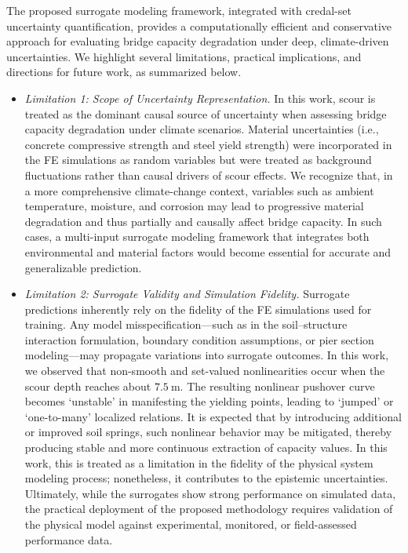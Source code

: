 \documentclass[authoryear,preprint,review,12pt]{elsarticle}
\begin{document}
The proposed surrogate modeling framework, integrated with credal-set uncertainty quantification, provides a computationally efficient and conservative approach for evaluating bridge capacity degradation under deep, climate-driven uncertainties. We highlight several limitations, practical implications, and directions for future work, as summarized below.

\begin{itemize}


\item \textit{Limitation 1: Scope of Uncertainty Representation.} 
In this work, scour is treated as the dominant causal source of uncertainty when assessing bridge capacity degradation under climate scenarios. Material uncertainties (i.e., concrete compressive strength and steel yield strength) were incorporated in the FE simulations as random variables but were treated as background fluctuations rather than causal drivers of scour effects. 
We recognize that, in a more comprehensive climate-change context, variables such as ambient temperature, moisture, and corrosion may lead to progressive material degradation and thus partially and causally affect bridge capacity. In such cases, a multi-input surrogate modeling framework that integrates both environmental and material factors would become essential for accurate and generalizable prediction. 



    \item \textit{Limitation 2: Surrogate Validity and Simulation Fidelity.} 
    Surrogate predictions inherently rely on the fidelity of the FE simulations used for training. Any model misspecification—such as in the soil–structure interaction formulation, boundary condition assumptions, or pier section modeling—may propagate variations into surrogate outcomes. In this work, we observed that non-smooth and set-valued nonlinearities occur when the scour depth reaches about $7.5\ \mathrm{m}$. The resulting nonlinear pushover curve becomes ‘unstable’ in manifesting the yielding points, leading to ‘jumped’ or ‘one-to-many’ localized relations. It is expected that by introducing additional or improved soil springs, such nonlinear behavior may be mitigated, thereby producing stable and more continuous extraction of capacity values. In this work, this is treated as a limitation in the fidelity of the physical system modeling process; nonetheless, it contributes to the epistemic uncertainties. Ultimately, while the surrogates show strong performance on simulated data, the practical deployment of the proposed methodology requires validation of the physical model against experimental, monitored, or field-assessed performance data.


\end{itemize}
\end{document}
